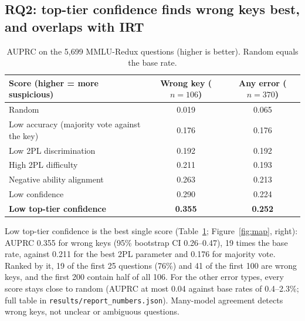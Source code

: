 \documentclass[10pt]{article}
\begin{document}
\subsection{RQ2: top-tier confidence finds wrong keys best, and overlaps with IRT}

\begin{table}[!htb]
\centering\small
\caption{AUPRC on the 5,699 MMLU-Redux questions (higher is better). Random equals the base rate.}
\label{tab:auprc}
\begin{tabular}{@{}lcc@{}}
\toprule
Score (higher = more suspicious) & Wrong key ($n=106$) & Any error ($n=370$) \\
\midrule
Random & 0.019 & 0.065 \\
Low accuracy (majority vote against the key) & 0.176 & 0.176 \\
Low 2PL discrimination & 0.192 & 0.192 \\
High 2PL difficulty & 0.211 & 0.193 \\
Negative ability alignment & 0.263 & 0.213 \\
Low confidence & 0.290 & 0.224 \\
\textbf{Low top-tier confidence} & \textbf{0.355} & \textbf{0.252} \\
\bottomrule
\end{tabular}
\end{table}

Low top-tier confidence is the best single score (Table~\ref{tab:auprc}; Figure~\ref{fig:map}, right):
AUPRC 0.355 for wrong keys (95\% bootstrap CI 0.26--0.47), 19 times the base rate, against 0.211 for
the best 2PL parameter and 0.176 for majority vote. Ranked by it, 19 of the first 25 questions
(76\%) and 41 of the first 100 are wrong keys, and the first 200 contain half of all 106. For the
other error types, every score stays close to random (AUPRC at most 0.04 against base rates of
0.4--2.3\%; full table in \texttt{results/report\_numbers.json}). Many-model agreement detects
wrong keys, not unclear or ambiguous questions.
\end{document}
